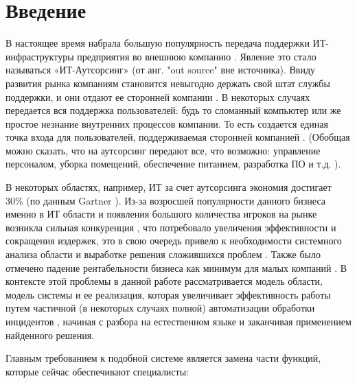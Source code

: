 \chapter*{Введение}							%

В настоящее время набрала большую популярность передача поддержки ИТ-инфраструктуры предприятия во внешнюю компанию \cite{StartToOutsource}. Явление это стало называться «ИТ-Аутсорсинг» (от анг. "out source" \- вне источника). Ввиду развития рынка компаниям становится невыгодно держать свой штат службы поддержки, и они отдают ее сторонней компании \cite{OutsourceEff}. В некоторых случаях передается вся поддержка пользователей: будь то сломанный компьютер или же простое незнание внутренних процессов компании. То есть создается единая точка входа для пользователей, поддерживаемая сторонней компанией \cite{OutsourceSD}. (Обобщая можно сказать, что на аутсорсинг передают все, что возможно: управление персоналом, уборка помещений, обеспечение питанием, разработка ПО \cite{OutsourceSoft} и т.д. ).\par
В некоторых областях, например, ИТ за счет аутсорсинга экономия достигает 30\% (по данным Gartner \cite{OutsourceIT}).
Из-за возросшей популярности данного бизнеса именно в ИТ области и появления большого количества игроков на рынке возникла сильная конкуренция \cite{AUTOS-1}, что потребовало увеличения эффективности и сокращения издержек, это в свою очередь привело к необходимости системного анализа области и выработке решения сложившихся проблем \cite{AUTOM-1}. Также было отмечено падение рентабельности бизнеса как минимум для малых компаний \cite{OUTSOURCE-RENT} \cite{OutsourceEff}. В контексте этой проблемы в данной работе рассматривается модель области, модель системы и ее реализация, которая увеличивает эффективность работы путем частичной (в некоторых случаях полной) автоматизации обработки инцидентов \cite{SDAUTOM}, начиная с разбора на естественном языке и заканчивая применением найденного решения. \par
Главным требованием к подобной системе является замена части функций, которые сейчас обеспечивают специалисты:
